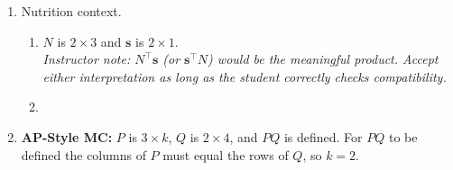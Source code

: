 \documentclass[10pt]{article}
\begin{document}
\begin{enumerate}[leftmargin=1.6em, itemsep=14pt]
\vspace{0.2in}

\item Nutrition context.
\begin{enumerate}[label=(\alph*), itemsep=6pt]
  \item $N$ is $2\times 3$ and $\mathbf{s}$ is $2\times 1$. \\[4pt]
        \textit{Instructor note: $N^{\top}\mathbf{s}$ (or $\mathbf{s}^{\top}N$) would be the meaningful product. Accept either interpretation as long as the student correctly checks compatibility.}
  \item {}
\end{enumerate}

\vspace{0.2in}

\item \textbf{AP-Style MC:} $P$ is $3\times k$, $Q$ is $2\times 4$, and $PQ$ is defined.
For $PQ$ to be defined the columns of $P$ must equal the rows of $Q$, so $k = 2$.

\end{enumerate}
\end{document}
